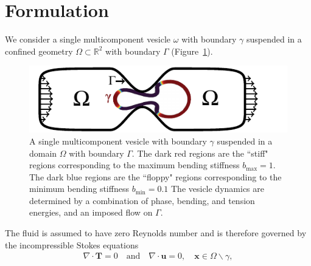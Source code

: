 \documentclass[twoside,twocolumn,9pt]{article}
\newcommand{\RR}{\mathbb{R}}
\newcommand{\uu}{\mathbf{u}}
\newcommand{\TT}{\mathbf{T}}
\newcommand{\xx}{\mathbf{x}}
\begin{document}






\section{\label{sec:Formulation}Formulation}
We consider a single multicomponent vesicle $\omega$ with boundary $\gamma$ suspended in a confined geometry $\Omega \subset \RR ^2$ with boundary $\Gamma$ (Figure~\ref{fig:schematic}).
\begin{figure}[H]
    \centering
    \includegraphics[trim = 0.3cm 0cm 1cm 0cm, clip=true,width=0.9\columnwidth]{figures/schematic.pdf}
    \caption{\label{fig:schematic}\small A single multicomponent vesicle with boundary $\gamma$ suspended in a domain $\Omega$ with boundary $\Gamma$. The dark red regions are the ``stiff" regions corresponding to the maximum bending stiffness $b_{\max}=1$. The dark blue regions are the ``floppy" regions corresponding to the minimum bending stiffness $b_{\min}=0.1$ The vesicle dynamics are determined by a combination of phase, bending, and tension energies, and an imposed flow on $\Gamma$. }
\end{figure}
The fluid is assumed to have zero Reynolds number and is therefore governed by the incompressible Stokes equations
\begin{align}
    \nabla \cdot \TT = 0 \quad \text{and} \quad \nabla \cdot \uu = 0, 
        \quad \xx \in \Omega \backslash \gamma,
\end{align}
\end{document}
